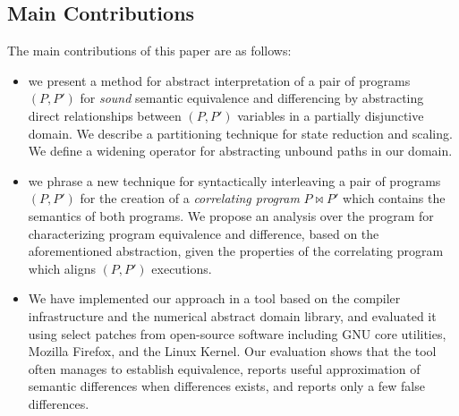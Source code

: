 \subsection{Main Contributions}
The main contributions of this paper are as follows:
\begin{itemize}
\item we present a method for abstract interpretation of a pair of programs $(P,P')$ for \emph{sound} semantic equivalence and differencing by abstracting direct relationships between $(P,P')$ variables in a partially disjunctive domain. We describe a partitioning technique for state reduction and scaling. We define a widening operator for abstracting unbound paths in our domain.
\item we phrase a new technique for syntactically interleaving a pair of programs $(P,P')$ for the creation of a \emph{correlating program} $P \bowtie P'$ which contains the semantics of both programs. We propose an analysis over the program for characterizing program equivalence and difference, based on the aforementioned abstraction, given the properties of the correlating program which aligns $(P,P')$ executions.
\item We have implemented our approach in a tool based on the  compiler infrastructure and the  numerical abstract
    domain library, and evaluated it using select patches from open-source software including GNU core utilities, Mozilla
    Firefox, and the Linux Kernel. Our evaluation shows that the tool often manages to establish equivalence, reports useful
    approximation of semantic differences when differences exists, and reports only a few false differences.
\end{itemize}


